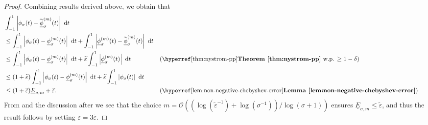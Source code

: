 \begin{proof}
Combining results derived above, we obtain that 
    \begin{align}
        &\int_{-1}^{1} \left| \phi_{\sigma}(t) - \widetilde{\underline{\phi}}_{\sigma}^{(m)}(t) \right|~\mathrm{d}t \notag \\
        &\leq \int_{-1}^{1} \left| \phi_{\sigma}(t) - \underline{\phi}_{\sigma}^{(m)}(t) \right|~\mathrm{d}t + \int_{-1}^{1} \left| \underline{\phi}_{\sigma}^{(m)}(t) - \widetilde{\underline{\phi}}_{\sigma}^{(m)}(t) \right|~\mathrm{d}t &&  \notag \\
        &\leq \int_{-1}^{1} \left| \phi_{\sigma}(t) - \underline{\phi}_{\sigma}^{(m)}(t) \right|~\mathrm{d}t + \widetilde{\varepsilon} \int_{-1}^{1} \left| \underline{\phi}_{\sigma}^{(m)}(t) \right|~\mathrm{d}t && \text{(\refthm{thm:nystrom-pp} w.p. $\geq 1 - \delta$)} \notag \\
        &\leq (1 + \widetilde{\varepsilon}) \int_{-1}^{1} \left| \phi_{\sigma}(t) - \underline{\phi}_{\sigma}^{(m)}(t) \right|~\mathrm{d}t + \widetilde{\varepsilon} \int_{-1}^{1} \left| \phi_{\sigma}(t) \right|~\mathrm{d}t &&  \notag \\
        &\leq (1 + \widetilde{\varepsilon}) \underline{E}_{\sigma, m} + \widetilde{\varepsilon}. && \text{(\reflem{lem:non-negative-chebyshev-error})} \notag 
    \end{align}
    From  and the discussion after  we see that the choice $m = \mathcal{O}((\log(\widetilde{\varepsilon}^{-1}) + \log(\sigma^{-1})) / \log(\sigma + 1))$ ensures $\underline{E}_{\sigma, m} \leq \widetilde{\varepsilon}$, and thus
    the result follows by setting $\varepsilon = 3 \widetilde{\varepsilon}$.
\end{proof}



